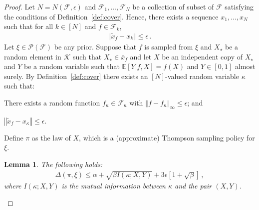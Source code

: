 \documentclass[letter, 12pt]{report}
\newcommand{\norm}[1]{\left \Vert  #1 \right \Vert}
\newcommand{\snorm}[1]{ \Vert  #1 \Vert}
\newcommand{\E}{\mathbb E}
\newcommand{\cK}{\mathcal K}
\newcommand{\sF}{\mathscr F}
\newcommand{\sP}{\mathscr P}
\newcommand{\diam}{\operatorname{diam}}
\newcommand{\poly}{\operatorname{poly}}
\newcommand{\1}{\mathbf{1}}
\theoremstyle{plain}
\newtheorem{lemma}[theorem]{Lemma}
\theoremstyle{definition}
\theoremstyle{remark}
\begin{document}
\begin{proof}
    Let $N = N(\sF, \epsilon)$
    and $\sF_1,\ldots,\sF_N$ be a collection of subset of $\sF$ satisfying the conditions of Definition~\ref{def:cover}.
    Hence, there exists a sequence $x_1,\ldots,x_N$ such that for all $k \in [N]$ and $f \in \sF_k$,
    \begin{align*}
        \snorm{\tilde x_f - x_k} \leq \epsilon \,.
    \end{align*}
    Let $\xi \in \sP(\sF)$ be any prior.
    Suppose that $f$ is sampled from $\xi$ and $X_\star$ be a random element in $\cK$ such that $X_\star \in \bar x_f$ and let $X$ be an independent copy of $X_\star$
    and $Y$ be a random variable such that $\E[Y|f, X] = f(X)$ and $Y \in [0,1]$ almost surely.
    By Definition~\ref{def:cover} there exists an $[N]$-valued random variable $\kappa$ such that:
    \begin{enumroman}
        \item There exists a random function $f_\kappa \in \sF_\kappa$ with $\norm{f - f_\kappa}_\infty \leq \epsilon$; and \label{proof:ir:i}
        \item $\norm{\tilde x_f - x_\kappa} \leq \epsilon$. \label{proof:ir:ii}
    \end{enumroman}
    Define $\pi$ as the law of $X$, which is a (approximate) Thompson sampling policy for $\xi$.

    \begin{lemma}\label{lem:ir}
        The following holds:
        \begin{align*}
            \Delta(\pi, \xi) \leq \alpha + \sqrt{\beta I(\kappa ; X, Y)} + 3\epsilon[1 + \sqrt{\beta}] \,,
        \end{align*}
        where $I(\kappa ; X, Y)$ is the mutual information between $\kappa$ and the pair $(X, Y)$.
    \end{lemma}


\end{proof}
\end{document}
